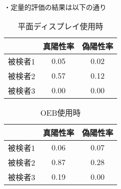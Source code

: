 ・定量的評価の結果は以下の通り

\begin{table}[h]
  \begin{center}
  \begin{tabular}{|c|c|c|}
  \hline
       & 真陽性率 & 偽陽性率 \\ \hline
  被検者1 & 0.05 & 0.02 \\ \hline
  被検者2 & 0.57 & 0.12 \\ \hline
  被検者3 & 0.00 & 0.00 \\ \hline
  \end{tabular}
  \caption{平面ディスプレイ使用時}
\end{center}
\end{table}

\begin{table}[h]
  \begin{center}
  \begin{tabular}{|c|c|c|}
  \hline
       & 真陽性率 & 偽陽性率 \\ \hline
  被検者1 & 0.06 & 0.07 \\ \hline
  被検者2 & 0.87 & 0.28 \\ \hline
  被検者3 & 0.19 & 0.00 \\ \hline
  \end{tabular}
  \caption{OEB使用時}
\end{center}
\end{table}
